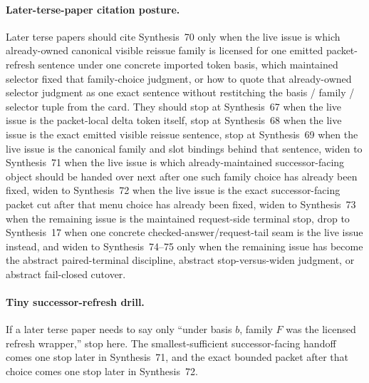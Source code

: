 \documentclass[11pt]{article}
\begin{document}
\paragraph{Later-terse-paper citation posture.}
Later terse papers should cite Synthesis~70 only when the live issue is which already-owned canonical visible reissue family is licensed for one emitted packet-refresh sentence under one concrete imported token basis, which maintained selector fixed that family-choice judgment, or how to quote that already-owned selector judgment as one exact sentence without restitching the basis / family / selector tuple from the card. They should stop at Synthesis~67 when the live issue is the packet-local delta token itself, stop at Synthesis~68 when the live issue is the exact emitted visible reissue sentence, stop at Synthesis~69 when the live issue is the canonical family and slot bindings behind that sentence, widen to Synthesis~71 when the live issue is which already-maintained successor-facing object should be handed over next after one such family choice has already been fixed, widen to Synthesis~72 when the live issue is the exact successor-facing packet cut after that menu choice has already been fixed, widen to Synthesis~73 when the remaining issue is the maintained request-side terminal stop, drop to Synthesis~17 when one concrete checked-answer/request-tail seam is the live issue instead, and widen to Synthesis~74--75 only when the remaining issue has become the abstract paired-terminal discipline, abstract stop-versus-widen judgment, or abstract fail-closed cutover.\cite{series:publicrequestresponsepacketrefreshresponsepackets,series:publicrequestresponsepacketrefreshresponsepacketclosureverdicts,series:pairedterminalcitationdiscipline,series:pairedterminalcutoverrule,series:workedexample}

\paragraph{Tiny successor-refresh drill.}
If a later terse paper needs to say only ``under basis $b$, family $F$ was the licensed refresh wrapper,'' stop here. The smallest-sufficient successor-facing handoff comes one stop later in Synthesis~71, and the exact bounded packet after that choice comes one stop later in Synthesis~72.
\end{document}
